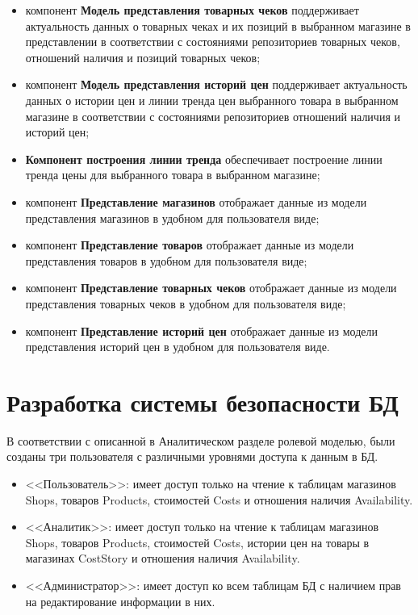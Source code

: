 \documentclass[a4paper]{bmstu}
\begin{document}
\begin{itemize}
	\item компонент \textbf{Модель представления товарных чеков} поддерживает актуальность данных о товарных чеках и их позиций в выбранном магазине  в представлении в соответствии с состояниями репозиториев товарных чеков, отношений наличия и позиций товарных чеков;
	
	\item компонент \textbf{Модель представления историй цен} поддерживает актуальность данных о истории цен и линии тренда цен выбранного товара в выбранном магазине в соответствии с состояниями репозиториев отношений наличия и историй цен;
	
	\item \textbf{Компонент построения линии тренда} обеспечивает построение линии тренда цены для выбранного товара в выбранном магазине;
	
	\item компонент \textbf{Представление магазинов} отображает данные из модели представления магазинов в удобном для пользователя виде;
	
	\item компонент \textbf{Представление товаров} отображает данные из модели представления товаров в удобном для пользователя виде;
	
	\item компонент \textbf{Представление товарных чеков} отображает данные из модели представления товарных чеков в удобном для пользователя виде;
	
	\item компонент \textbf{Представление историй цен} отображает данные из модели представления историй цен в удобном для пользователя виде.
\end{itemize}


\section{Разработка системы безопасности БД}

В соответствии с описанной в Аналитическом разделе ролевой моделью, были созданы три пользователя с различными уровнями доступа к данным в БД.

\begin{itemize}
	\item <<Пользователь>>: имеет доступ только на чтение к таблицам магазинов Shops, товаров Products, стоимостей Costs и отношения наличия Availability.
	\item <<Аналитик>>: имеет доступ только на чтение к таблицам магазинов Shops, товаров Products, стоимостей Costs, истории цен на товары в магазинах CostStory и отношения наличия Availability.
	\item <<Администратор>>: имеет доступ ко всем таблицам БД с наличием прав на редактирование информации в них.
\end{itemize}
\end{document}

